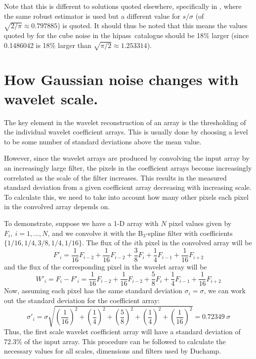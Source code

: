\documentclass[12pt,a4paper]{article}
\newcommand{\hipass}{{\sc hipass}}
\begin{document}
Note that this is different to solutions quoted elsewhere,
specifically in \citet{meyer04:trunc}, where the same robust estimator is
used but a different value for $s/\sigma$ (of
$\sqrt{2/\pi}\approx0.797885$) is quoted. It should thus be noted that
this means the values quoted by \citet{meyer04:trunc} for the cube noise in
the \hipass\ catalogue should be 18\% larger (since 0.1486042 is 18\%
larger than $\sqrt{\pi/2}\approx1.253314$). 

\section{How Gaussian noise changes with wavelet scale.}
\label{app-scaling}

The key element in the wavelet reconstruction of an array is the
thresholding of the individual wavelet coefficient arrays. This is
usually done by choosing a level to be some number of standard
deviations above the mean value.

However, since the wavelet arrays are produced by convolving the input
array by an increasingly large filter, the pixels in the coefficient
arrays become increasingly correlated as the scale of the filter
increases. This results in the measured standard deviation from a
given coefficient array decreasing with increasing scale. To calculate
this, we need to take into account how many other pixels each pixel in
the convolved array depends on.

To demonstrate, suppose we have a 1-D array with $N$ pixel values
given by $F_i,\ i=1,...,N$, and we convolve it with the B$_3$-spline
filter with coefficients $\{1/16,1/4,3/8,1/4,1/16\}$. The flux of the
$i$th pixel in the convolved array will be
\[
F'_i = \frac{1}{16}F_{i-2} + \frac{1}{16}F_{i-2} + \frac{3}{8}F_{i}
+ \frac{1}{4}F_{i-1} + \frac{1}{16}F_{i+2}
\]
and the flux of the corresponding pixel in the wavelet array will be 
\[
W'_i = F_i - F'_i = \frac{1}{16}F_{i-2} + \frac{1}{16}F_{i-2} + \frac{5}{8}F_{i}
+ \frac{1}{4}F_{i-1} + \frac{1}{16}F_{i+2}
\]
Now, assuming each pixel has the same standard deviation
$\sigma_i=\sigma$, we can work out the standard deviation for the
coefficient array:
\[
\sigma'_i = \sigma \sqrt{\left(\frac{1}{16}\right)^2 + \left(\frac{1}{4}\right)^2
  + \left(\frac{5}{8}\right)^2 + \left(\frac{1}{4}\right)^2 + \left(\frac{1}{16}\right)^2}
          = 0.72349\ \sigma
\]
Thus, the first scale wavelet coefficient array will have a standard
deviation of 72.3\% of the input array. This procedure can be followed
to calculate the necessary values for all scales, dimensions and
filters used by Duchamp.
\end{document}
